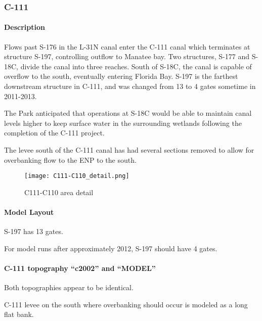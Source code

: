\clearpage

\subsubsection{C-111}
\paragraph{Description}
Flows past S-176 in the L-31N canal enter the C-111 canal which terminates at structure S-197, controlling outflow to Manatee bay.
Two structures, S-177 and S-18C, divide the canal into three reaches.
South of S-18C, the canal is capable of overflow to the south, eventually entering Florida Bay.
S-197 is the farthest downstream structure in C-111, and was changed from 13 to 4 gates sometime in 2011-2013.

The Park anticipated that operations at S-18C would be able to maintain canal levels higher to keep surface water in the surrounding wetlands following the completion of the C-111 project.

The levee south of the C-111 canal has had several sections removed to allow for overbanking flow to the ENP to the south.

\begin{figure}[!h]
  \begin{center}
  \texttt{[image: C111-C110\_detail.png]}
  \caption{C111-C110 area detail}
  \end{center}
\end{figure}

\paragraph{Model Layout}

S-197 has 13 gates.

For model runs after approximately 2012, S-197 should have 4 gates.

\paragraph{C-111 topography ``c2002'' and ``MODEL''}
Both topographies appear to be identical.

C-111 levee on the south where overbanking should occur is modeled as a long flat bank.

